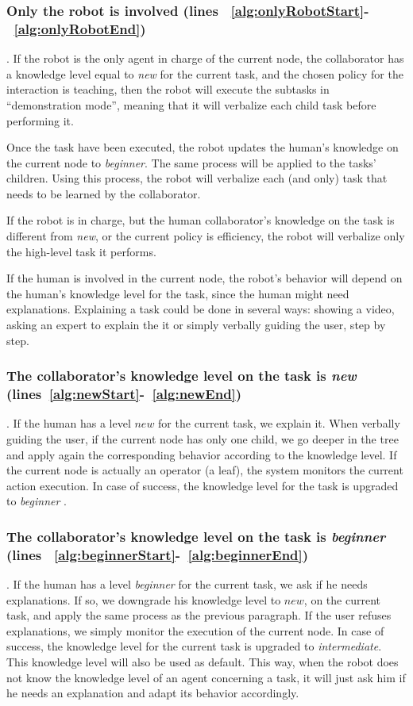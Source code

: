\subsubsection{Only the robot is involved (lines ~\ref{alg:onlyRobotStart}-~\ref{alg:onlyRobotEnd})}.
If the robot is the only agent in charge of the current node, the collaborator has a knowledge level equal to \textit{new} for the current task,
and the chosen policy for the interaction is teaching, then the robot will execute the subtasks in ``demonstration mode'', meaning that it will verbalize each child task before performing it.

Once the task have been executed, the robot updates the human's knowledge on the current node to \textit{beginner}. The same process will be applied to the tasks' children.  Using this process, the robot will verbalize each (and only) task that needs to be learned by the collaborator.

If the robot is in charge, but the human collaborator's knowledge on the task is different from \textit{new}, or the current policy is efficiency, the robot will verbalize only the high-level task it performs.


If the human is involved in the current node, the robot's behavior will depend on the human's knowledge level for the task, since the human might need explanations.  Explaining a task could be done in several ways: showing a video, asking an expert to explain the it or simply verbally guiding the user, step by step. 
\subsubsection{The collaborator's knowledge level on the task is \textit{new} (lines~\ref{alg:newStart}-~\ref{alg:newEnd})}. If the human has a level $new$ for the current task, we explain it.
When verbally guiding the user, if the current node has only one child, we  go deeper in the tree and apply again the corresponding behavior according to the knowledge level. If the current node is actually an operator (a leaf), the system monitors the current action execution. In case of success, the knowledge level for the task is upgraded to \textit{beginner} .

\subsubsection{The collaborator's knowledge level on the task is \textit{beginner} (lines ~\ref{alg:beginnerStart}-~\ref{alg:beginnerEnd})}. If the human has a level \textit{beginner} for the current task, we ask if he needs explanations. If so, we downgrade his knowledge level to $new$, on the current task, and apply the same process as the previous paragraph. If the user refuses explanations, we simply monitor the execution of the current node. In case of success, the knowledge level for the current task is upgraded to \textit{intermediate}. This knowledge level will also be used as default. This way, when the robot does not know the knowledge level of an agent concerning a task, it will just ask him if he needs an explanation and adapt its behavior accordingly.

